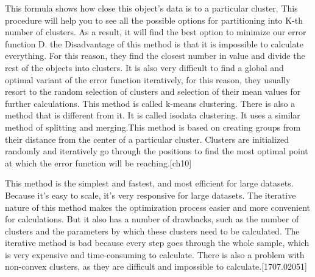 \vspace{-0.5cm}
\noindent This formula shows how close this object's data is to a particular cluster. This procedure will help you to see all the possible options for partitioning into K-th number of clusters. As a result, it will find the best option to minimize our error function D. the Disadvantage of this method is that it is impossible to calculate everything. For this reason, they find the closest number in value and divide the rest of the objects into clusters. It is also very difficult to find a global and optimal variant of the error function iteratively, for this reason, they usually resort to the random selection of clusters and selection of their mean values for further calculations. This method is called k-means clustering. There is also a method that is different from it. It is called isodata clustering. It uses a similar method of splitting and merging.This method is based on creating groups from their distance from the center of a particular cluster. Clusters are initialized randomly and iteratively go through the positions to find the most optimal point at which the error function will be reaching.[ch10]

\vspace{-0.5cm}
\noindent This method is the simplest and fastest, and most efficient for large datasets. Because it's easy to scale, it's very responsive for large datasets. The iterative nature of this method makes the optimization process easier and more convenient for calculations. But it also has a number of drawbacks, such as the number of clusters and the parameters by which these clusters need to be calculated. The iterative method is bad because every step goes through the whole sample, which is very expensive and time-consuming to calculate. There is also a problem with non-convex clusters, as they are difficult and impossible to calculate.[1707.02051]


\vspace{-0.3cm}

